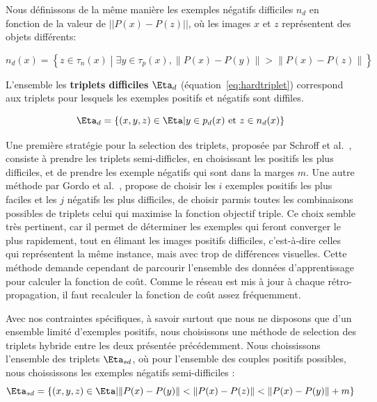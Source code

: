 Nous définissons de la même manière les exemples négatifs difficiles $n_d$ en fonction de la valeur de $||P(x) - P(z)||$, où les images $x$ et $z$ représentent des objets différents: 

\begin{equation}
n_d(x) = \left\{ z \in \tau_n(x) \middle| \exists y \in \tau_p(x),  \|P(x) - P(y)\| > \|P(x) - P(z)\| \right\}
\label{eq:minhard}
\end{equation}

L'ensemble les \textbf{triplets difficiles} $\Eta_d$ (équation~\ref{eq:hardtriplet}) correspond aux triplets pour lesquels les exemples positifs et négatifs sont diffiles.

\begin{equation}
\Eta_d = \left\{ (x,y,z) \in \Eta \middle| y \in p_d(x) \text{ et } z \in n_d(x) \right\}
\label{eq:hardtriplet}
\end{equation}

Une première stratégie pour la selection des triplets, proposée par Schroff et al.~\cite{schroff2015facenet}, consiste à prendre les triplets semi-difficles, en choisissant les positifs les plus difficiles, et de prendre les exemple négatifs qui sont dans la marges $m$.
Une autre méthode par Gordo et al.~\cite{gordo2016deep}, propose de choisir les $i$ exemples positifs les plus faciles et les $j$ négatifs les plus difficiles, de choisir parmis toutes les combinaisons possibles de triplets celui qui maximise la fonction objectif triple. 
Ce choix semble très pertinent, car il permet de déterminer les exemples qui feront converger le plus rapidement, tout en élimant les images positifs difficiles, c'est-à-dire celles qui représentent la même instance, mais avec trop de différences visuelles. 
Cette méthode demande cependant de parcourir l'ensemble des données d'apprentissage pour calculer la fonction de coût.
Comme le réseau est mis à jour à chaque rétro-propagation, il faut recalculer la fonction de coût assez fréquemment.

Avec nos contraintes spécifiques, à savoir surtout que nous ne disposons que d'un ensemble limité d'exemples positifs, nous choisissons une méthode de selection des triplets hybride entre les deux présentée précédemment. 
Nous choississons l'ensemble des triplets $\Eta_{sd}$, où pour l'ensemble des couples positifs possibles, nous choississons les exemples négatifs semi-difficiles :
\begin{equation}
\Eta_{sd} = \left\{ (x,y,z) \in \Eta \middle| \|P(x) - P(y)\| < \|P(x) - P(z)\| < \|P(x) - P(y)\| + m \right\}
\label{eq:semihardtriplets}
\end{equation}

